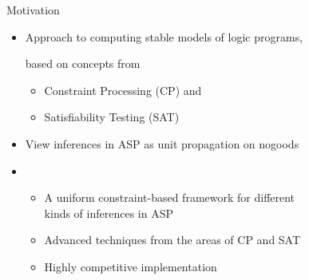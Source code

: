 \begin{frame}{Motivation}
  \begin{itemize}
  \item<1-> Approach to computing stable models of logic programs,

    based on concepts from
    \begin{itemize}
    \item Constraint Processing (CP) and
    \item Satisfiability Testing (SAT)
    \end{itemize}

  \item<1-> View inferences in ASP as unit propagation on nogoods

  \item<1-> \
    \begin{itemize}
    \item A uniform constraint-based framework for different\\ kinds of
      inferences in ASP
    \item Advanced techniques from the areas of CP and SAT
    \item Highly competitive implementation
    \end{itemize}
  \end{itemize}
\end{frame}

